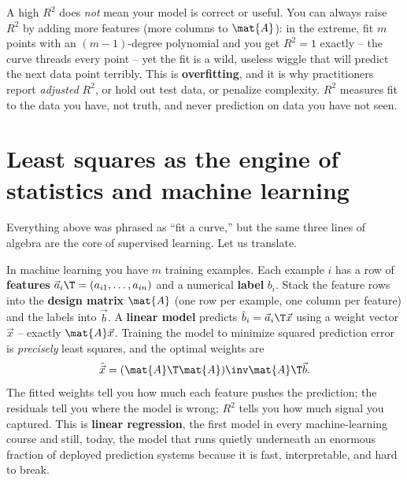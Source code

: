 \begin{trapbox}
A high $R^2$ does \emph{not} mean your model is correct or useful. You can always raise $R^2$ by
adding more features (more columns to $\mat{A}$): in the extreme, fit $m$ points with an
$(m{-}1)$-degree polynomial and you get $R^2=1$ exactly -- the curve threads every point -- yet the
fit is a wild, useless wiggle that will predict the next data point terribly. This is
\textbf{overfitting}, and it is why practitioners report \emph{adjusted} $R^2$, or hold out test
data, or penalize complexity. $R^2$ measures fit to the data you have, not truth, and never
prediction on data you have not seen.
\end{trapbox}

\section{Least squares as the engine of statistics and machine learning}

Everything above was phrased as ``fit a curve,'' but the same three lines of algebra are the core
of supervised learning. Let us translate.

In machine learning you have $m$ training examples. Each example $i$ has a row of
\textbf{features} $\vec{a}_i\T = (a_{i1},\dots,a_{in})$ and a numerical \textbf{label} $b_i$. Stack
the feature rows into the \textbf{design matrix} $\mat{A}$ (one row per example, one column per
feature) and the labels into $\vec{b}$. A \textbf{linear model} predicts $\hat{b}_i=\vec{a}_i\T
\vec{x}$ using a weight vector $\vec{x}$ -- exactly $\mat{A}\vec{x}$. Training the model to minimize
squared prediction error is \emph{precisely} least squares, and the optimal weights are
\[
  \hat{\vec{x}} = (\mat{A}\T\mat{A})\inv\mat{A}\T\vec{b}.
\]
The fitted weights tell you how much each feature pushes the prediction; the residuals tell you
where the model is wrong; $R^2$ tells you how much signal you captured. This is \textbf{linear
regression}, the first model in every machine-learning course and still, today, the model that
runs quietly underneath an enormous fraction of deployed prediction systems because it is fast,
interpretable, and hard to break.

